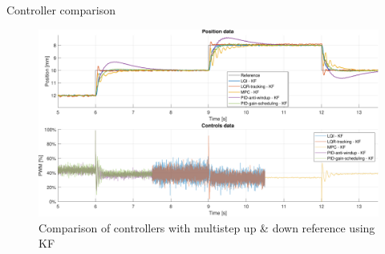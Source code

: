 \begin{frame}{Controller comparison}

    \vspace{9pt}

    \begin{figure}[H]
        \centering
        \includegraphics[width=1\linewidth]{./img/MATLAB/results/multisteps_updown_star_KF.pdf}
        \caption{Comparison of controllers with multistep up \& down reference using KF}
    \end{figure}

\end{frame}




